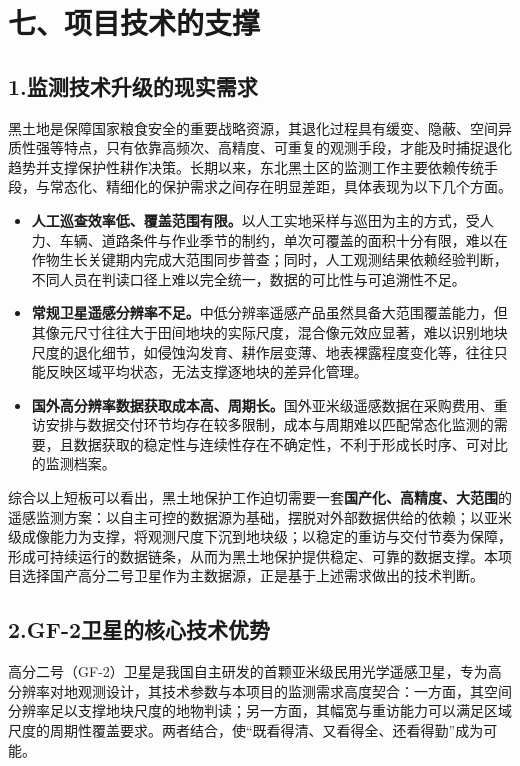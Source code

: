 \section{七、项目技术的支撑}

\subsection{1.监测技术升级的现实需求}

黑土地是保障国家粮食安全的重要战略资源，其退化过程具有缓变、隐蔽、空间异质性强等特点，只有依靠高频次、高精度、可重复的观测手段，才能及时捕捉退化趋势并支撑保护性耕作决策。长期以来，东北黑土区的监测工作主要依赖传统手段，与常态化、精细化的保护需求之间存在明显差距，具体表现为以下几个方面。

\begin{itemize}
    \item \textbf{人工巡查效率低、覆盖范围有限。}以人工实地采样与巡田为主的方式，受人力、车辆、道路条件与作业季节的制约，单次可覆盖的面积十分有限，难以在作物生长关键期内完成大范围同步普查；同时，人工观测结果依赖经验判断，不同人员在判读口径上难以完全统一，数据的可比性与可追溯性不足。
    \item \textbf{常规卫星遥感分辨率不足。}中低分辨率遥感产品虽然具备大范围覆盖能力，但其像元尺寸往往大于田间地块的实际尺度，混合像元效应显著，难以识别地块尺度的退化细节，如侵蚀沟发育、耕作层变薄、地表裸露程度变化等，往往只能反映区域平均状态，无法支撑逐地块的差异化管理。
    \item \textbf{国外高分辨率数据获取成本高、周期长。}国外亚米级遥感数据在采购费用、重访安排与数据交付环节均存在较多限制，成本与周期难以匹配常态化监测的需要，且数据获取的稳定性与连续性存在不确定性，不利于形成长时序、可对比的监测档案。
\end{itemize}

综合以上短板可以看出，黑土地保护工作迫切需要一套\textbf{国产化、高精度、大范围}的遥感监测方案：以自主可控的数据源为基础，摆脱对外部数据供给的依赖；以亚米级成像能力为支撑，将观测尺度下沉到地块级；以稳定的重访与交付节奏为保障，形成可持续运行的数据链条，从而为黑土地保护提供稳定、可靠的数据支撑。本项目选择国产高分二号卫星作为主数据源，正是基于上述需求做出的技术判断。

\subsection{2.GF-2卫星的核心技术优势}

高分二号（GF-2）卫星是我国自主研发的首颗亚米级民用光学遥感卫星，专为高分辨率对地观测设计，其技术参数与本项目的监测需求高度契合：一方面，其空间分辨率足以支撑地块尺度的地物判读；另一方面，其幅宽与重访能力可以满足区域尺度的周期性覆盖要求。两者结合，使“既看得清、又看得全、还看得勤”成为可能。

